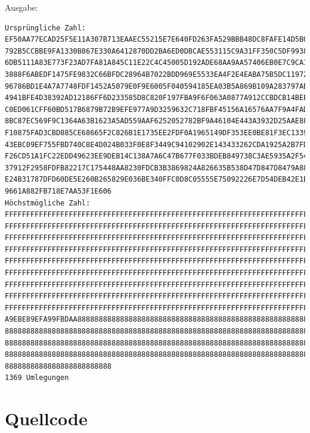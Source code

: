 \documentclass[a4paper,10pt,ngerman]{scrartcl}
\begin{document}
Ausgabe: \begin{lstlisting}
Ursprüngliche Zahl:
EF50AA77ECAD25F5E11A307B713EAAEC55215E7E640FD263FA529BBB48DC8FAFE14D5B02EBF
792B5CCBBE9FA1330B867E330A6412870DD2BA6ED0DBCAE553115C9A31FF350C5DF99382488
6DB5111A83E773F23AD7FA81A845C11E22C4C45005D192ADE68AA9AA57406EB0E7C9CA13AD0
3888F6ABEDF1475FE9832C66BFDC28964B7022BDD969E5533EA4F2E4EABA75B5DC119728248
96786BD1E4A7A7748FDF1452A5079E0F9E6005F040594185EA03B5A869B109A283797AB3139
4941BFE4D38392AD12186FF6D233585D8C820F197FBA9F6F063A0877A912CCBDCB14BEECBAE
C0ED061CFF60BD517B6879B72B9EFE977A9D3259632C718FBF45156A16576AA7F9A4FAD40AD
8BC87EC569F9C1364A63B1623A5AD559AAF6252052782BF9A46104E443A3932D25AAE8F8C59
F10875FAD3CBD885CE68665F2C826B1E1735EE2FDF0A1965149DF353EE0BE81F3EC133922EF
43EBC09EF755FBD740C8E4D024B033F0E8F3449C94102902E143433262CDA1925A2B7FD01BE
F26CD51A1FC22EDD49623EE9DEB14C138A7A6C47B677F033BDEB849738C3AE5935A2F54B992
37912F2958FDFB82217C175448AA8230FDCB3B3869824A826635B538D47D847D8479A88F350
E24B31787DFD60DE5E260B265829E036BE340FFC0D8C05555E75092226E7D54DEB42E1BB2CA
9661A882FB718E7AA53F1E606
Höchstmögliche Zahl:
FFFFFFFFFFFFFFFFFFFFFFFFFFFFFFFFFFFFFFFFFFFFFFFFFFFFFFFFFFFFFFFFFFFFFFFFFFF
FFFFFFFFFFFFFFFFFFFFFFFFFFFFFFFFFFFFFFFFFFFFFFFFFFFFFFFFFFFFFFFFFFFFFFFFFFF
FFFFFFFFFFFFFFFFFFFFFFFFFFFFFFFFFFFFFFFFFFFFFFFFFFFFFFFFFFFFFFFFFFFFFFFFFFF
FFFFFFFFFFFFFFFFFFFFFFFFFFFFFFFFFFFFFFFFFFFFFFFFFFFFFFFFFFFFFFFFFFFFFFFFFFF
FFFFFFFFFFFFFFFFFFFFFFFFFFFFFFFFFFFFFFFFFFFFFFFFFFFFFFFFFFFFFFFFFFFFFFFFFFF
FFFFFFFFFFFFFFFFFFFFFFFFFFFFFFFFFFFFFFFFFFFFFFFFFFFFFFFFFFFFFFFFFFFFFFFFFFF
FFFFFFFFFFFFFFFFFFFFFFFFFFFFFFFFFFFFFFFFFFFFFFFFFFFFFFFFFFFFFFFFFFFFFFFFFFF
FFFFFFFFFFFFFFFFFFFFFFFFFFFFFFFFFFFFFFFFFFFFFFFFFFFFFFFFFFFFFFFFFFFFFFFFFFF
FFFFFFFFFFFFFFFFFFFFFFFFFFFFFFFFFFFFFFFFFFFFFFFFFFFFFFFFFFFFFFFFFFFFFFF88EF
A9EBE89EFA99FBDAA8888888888888888888888888888888888888888888888888888888888
888888888888888888888888888888888888888888888888888888888888888888888888888
888888888888888888888888888888888888888888888888888888888888888888888888888
888888888888888888888888888888888888888888888888888888888888888888888888888
8888888888888888888888888
1369 Umlegungen
\end{lstlisting}
\section{Quellcode}

\end{document}

